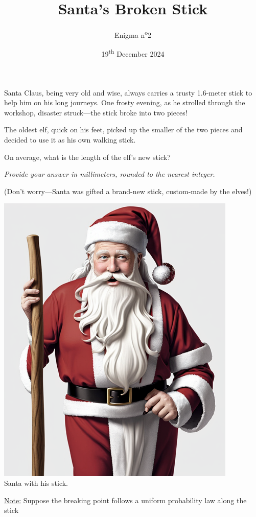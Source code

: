 \documentclass[a4paper, top=10mm]{article}
\title{\textbf{\huge{Santa's Broken Stick}}}
\author{Enigma n\textsuperscript{o}2}
\date{19\textsuperscript{th} December 2024}
\begin{document}
	\maketitle
	
	Santa Claus, being very old and wise, always carries a trusty 1.6-meter stick to help him on his long journeys. One frosty evening, as he strolled through the workshop, disaster struck—the stick broke into two pieces!
	
	The oldest elf, quick on his feet, picked up the smaller of the two pieces and decided to use it as his own walking stick.
	
	On average, what is the length of the elf’s new stick?
	
	\textit{Provide your answer in millimeters, rounded to the nearest integer.}
	
	(Don’t worry—Santa was gifted a brand-new stick, custom-made by the elves!)
	
	\begin{center}
		\includegraphics[height=400pt]{02santa_with_stick.png}\\
		Santa with his stick.
	\end{center}
	
	\underline{Note:} Suppose the breaking point follows a uniform probability law along the stick
	
	
\end{document}
